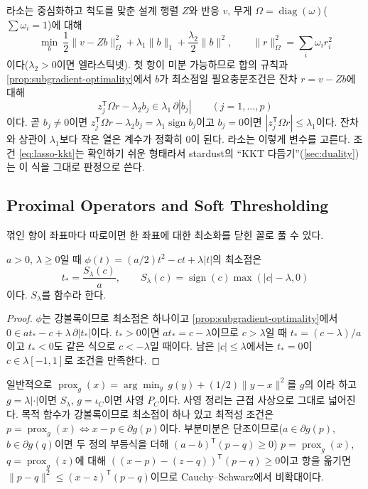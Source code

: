 라소\cite{tibshirani1996}는 중심화하고 척도를 맞춘 설계 행렬 $Z$와 반응 $v$, 무게 $\Omega=\operatorname{diag}(\omega)$($\sum\omega_i=1$)에 대해
\begin{equation}
\label{eq:lasso}
\min_b\ \frac12\|v-Zb\|_\Omega^2+\lambda_1\|b\|_1+\frac{\lambda_2}2\|b\|^2,\qquad\|r\|_\Omega^2=\sum_i\omega_ir_i^2
\end{equation}
이다($\lambda_2>0$이면 엘라스틱넷). 첫 항이 미분 가능하므로 합의 규칙과 \cref{prop:subgradient-optimality}에서 $b$가 최소점일 필요충분조건은 잔차 $r=v-Zb$에 대해
\begin{equation}
\label{eq:lasso-kkt}
z_j^{\mathsf T}\Omega r-\lambda_2b_j\in\lambda_1\,\partial|b_j|\qquad(j=1,\dots,p)
\end{equation}
이다. 곧 $b_j\ne0$이면 $z_j^{\mathsf T}\Omega r-\lambda_2b_j=\lambda_1\operatorname{sign}b_j$이고 $b_j=0$이면 $|z_j^{\mathsf T}\Omega r|\le\lambda_1$이다. 잔차와 상관이 $\lambda_1$보다 작은 열은 계수가 정확히 $0$이 된다. 라소는 이렇게 변수를 고른다. 조건 \cref{eq:lasso-kkt}는 확인하기 쉬운 형태라서 stardust의 ``KKT 다듬기''(\cref{sec:duality})는 이 식을 그대로 판정으로 쓴다.

\subsection{Proximal Operators and Soft Thresholding}

꺾인 항이 좌표마다 따로이면 한 좌표에 대한 최소화를 닫힌 꼴로 풀 수 있다.

\begin{proposition}
\label{prop:soft}
$a>0$, $\lambda\ge0$일 때 $\phi(t)=(a/2)t^2-ct+\lambda|t|$의 최소점은
\[
t_\ast=\frac{S_\lambda(c)}a,\qquad S_\lambda(c)=\operatorname{sign}(c)\max(|c|-\lambda,0)
\]
이다. $S_\lambda$를  함수라 한다.
\end{proposition}

\begin{proof}
$\phi$는 강볼록이므로 최소점은 하나이고 \cref{prop:subgradient-optimality}에서 $0\in at_\ast-c+\lambda\,\partial|t_\ast|$이다. $t_\ast>0$이면 $at_\ast=c-\lambda$이므로 $c>\lambda$일 때 $t_\ast=(c-\lambda)/a$이고 $t_\ast<0$도 같은 식으로 $c<-\lambda$일 때이다. 남은 $|c|\le\lambda$에서는 $t_\ast=0$이 $c\in\lambda[-1,1]$로 조건을 만족한다.
\end{proof}

일반적으로 $\operatorname{prox}_g(x)=\arg\min_y\,g(y)+(1/2)\|y-x\|^2$를 $g$의 이라 하고 $g=\lambda|\cdot|$이면 $S_\lambda$, $g=\iota_C$이면 사영 $P_C$이다. 사영 정리는 근접 사상으로 그대로 넓어진다. 목적 함수가 강볼록이므로 최소점이 하나 있고 최적성 조건은 $p=\operatorname{prox}_g(x)\iff x-p\in\partial g(p)$이다. 부분미분은 단조이므로($a\in\partial g(p)$, $b\in\partial g(q)$이면 두 정의 부등식을 더해 $(a-b)^{\mathsf T}(p-q)\ge0$) $p=\operatorname{prox}_g(x)$, $q=\operatorname{prox}_g(z)$에 대해 $((x-p)-(z-q))^{\mathsf T}(p-q)\ge0$이고 항을 옮기면 $\|p-q\|^2\le(x-z)^{\mathsf T}(p-q)$이므로 Cauchy--Schwarz에서 비확대이다.

